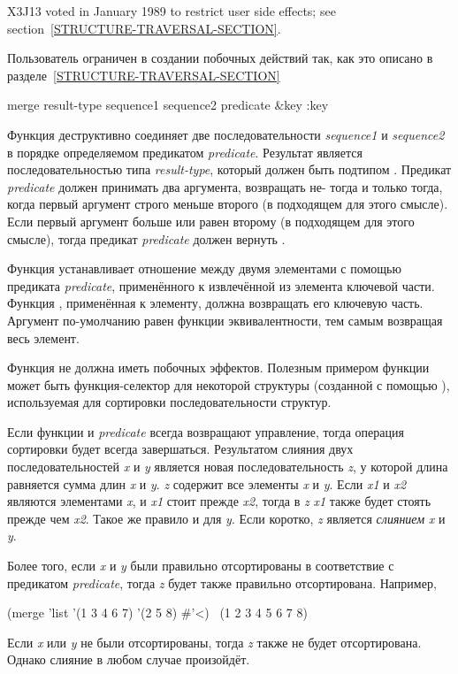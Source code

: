 \begin{defun}[Функция]
\begin{new}
X3J13 voted in January 1989
to restrict user side effects; see section~\ref{STRUCTURE-TRAVERSAL-SECTION}.
\end{new}

Пользователь ограничен в создании побочных действий так, как это описано в
разделе~\ref{STRUCTURE-TRAVERSAL-SECTION}
\end{defun}

\begin{defun}[Функция]
merge result-type sequence1 sequence2 predicate &key :key

Функция деструктивно соединяет две последовательности \emph{sequence1} и
\emph{sequence2} в порядке определяемом предикатом \emph{predicate}.
Результат является последовательностью типа \emph{result-type}, который должен
быть подтипом .
Предикат \emph{predicate} должен принимать два аргумента,
возвращать не-{\false} тогда и только тогда, когда первый аргумент строго меньше
второго (в подходящем для этого смысле).
Если первый аргумент больше или равен второму (в подходящем для этого смысле),
тогда предикат \emph{predicate} должен вернуть {\false}.

Функция  устанавливает отношение между двумя элементами с помощью
предиката \emph{predicate}, применённого к извлечённой из элемента ключевой
части. Функция , применённая к элементу, должна возвращать его ключевую
часть.
Аргумент  по-умолчанию равен функции эквивалентности, тем самым
возвращая весь элемент.

Функция  не должна иметь побочных эффектов.
Полезным примером функции  может быть функция-селектор для некоторой
структуры (созданной с помощью ), используемая для сортировки
последовательности структур.

Если функции  и \emph{predicate} всегда возвращают управление, тогда
операция сортировки будет всегда завершаться.
Результатом слияния двух последовательностей \emph{x} и \emph{y} является новая
последовательность \emph{z}, у которой длина равняется сумма длин \emph{x} и
\emph{y}. \emph{z} содержит все элементы \emph{x} и \emph{y}.
Если \emph{x1} и \emph{x2} являются элементами \emph{x}, и \emph{x1} стоит
прежде \emph{x2}, тогда в \emph{z} \emph{x1} также будет стоять прежде чем
\emph{x2}. Такое же правило и для \emph{y}. Если коротко, \emph{z} является
\emph{слиянием} \emph{x} и \emph{y}.

Более того, если \emph{x} и \emph{y} были правильно отсортированы в соответствие
с предикатом \emph{predicate}, тогда \emph{z} будет также правильно
отсортирована. Например,
\begin{lisp}
(merge 'list '(1 3 4 6 7) '(2 5 8) \#'<) \EV\ (1 2 3 4 5 6 7 8)
\end{lisp}
Если \emph{x} или \emph{y} не были отсортированы, тогда \emph{z} также не будет
отсортирована. Однако слияние в любом случае произойдёт.


\end{defun}
